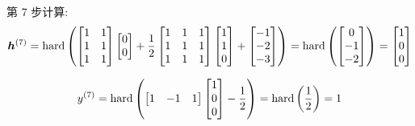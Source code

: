 \documentclass{article}
\begin{document}
第 7 步计算:
\begin{equation}
  \bm{h}^{(7)}
  =\operatorname{hard}\left(
    \begin{bmatrix}
      1 & 1 \\
      1 & 1 \\
      1 & 1 \\
    \end{bmatrix}
    \begin{bmatrix}
      0 \\ 0 \\
    \end{bmatrix}
    +\frac{1}{2}
    \begin{bmatrix}
      1 & 1 & 1 \\
      1 & 1 & 1 \\
      1 & 1 & 1 \\
    \end{bmatrix}
    \begin{bmatrix}
      1 \\ 1 \\ 0 \\
    \end{bmatrix}
    +
    \begin{bmatrix}
      -1 \\ -2 \\ -3 \\
    \end{bmatrix}
  \right)
  =\operatorname{hard}\left(
    \begin{bmatrix}
      0 \\ -1 \\ -2 \\
    \end{bmatrix}
  \right)
  =
  \begin{bmatrix}
    1 \\ 0 \\ 0 \\
  \end{bmatrix}
\end{equation}

\begin{equation}
  y^{(7)}
  =\operatorname{hard}\left(
    \begin{bmatrix}
      1 & -1 & 1 \\
    \end{bmatrix}
    \begin{bmatrix}
      1 \\ 0 \\ 0 \\
    \end{bmatrix}
    -\frac{1}{2}
  \right)
  =\operatorname{hard}\left(
    \frac{1}{2}
  \right)
  =1
\end{equation}
\end{document}

